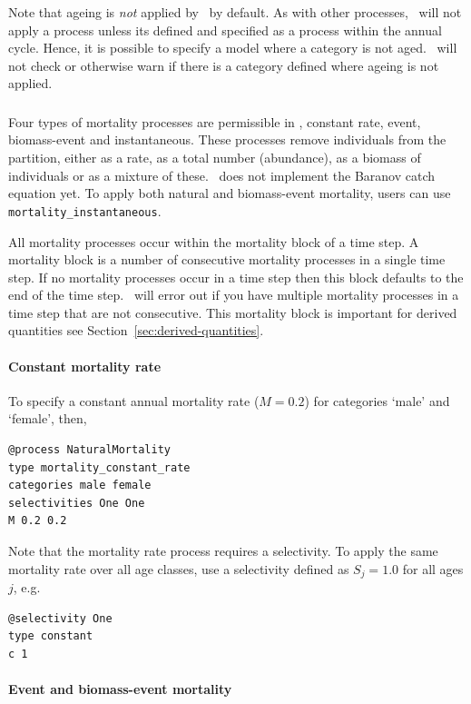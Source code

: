 Note that ageing is \emph{not} applied by \CNAME\ by default. As with other processes, \CNAME\ will not apply a process unless its defined and specified as a process within the annual cycle. Hence, it is possible to specify a model where a category is not aged. \CNAME\ will not check or otherwise warn if there is a category defined where ageing is not applied.

\subsubsection{\label{sec:mortality}}
Four types of mortality processes are permissible in \CNAME, constant rate, event, biomass-event and instantaneous. These processes remove individuals from the partition, either as a rate, as a total number (abundance), as a biomass of individuals or as a mixture of these. \CNAME\ does not implement the Baranov catch equation yet. To apply both natural and biomass-event mortality, users can use \texttt{mortality\_instantaneous}.

All mortality processes occur within the mortality block of a time step. A mortality block is a number of consecutive mortality processes in a single time step. If no mortality processes occur in a time step then this block defaults to the end of the time step. \CNAME\ will error out if you have multiple mortality processes in a time step that are not consecutive. This mortality block is important for derived quantities see Section~\ref{sec:derived-quantities}.

\paragraph{Constant mortality rate}

To specify a constant annual mortality rate ($M=0.2$) for categories `male' and `female', then, 
{\small{\begin{verbatim}
@process NaturalMortality
type mortality_constant_rate
categories male female
selectivities One One
M 0.2 0.2
\end{verbatim}}}
Note that the mortality rate process requires a selectivity. To apply the same mortality rate over all age classes, use a selectivity defined as $S_j=1.0$ for all ages $j$, e.g.
{\small{\begin{verbatim}
@selectivity One
type constant
c 1
\end{verbatim}}}

\paragraph{Event and biomass-event mortality}

